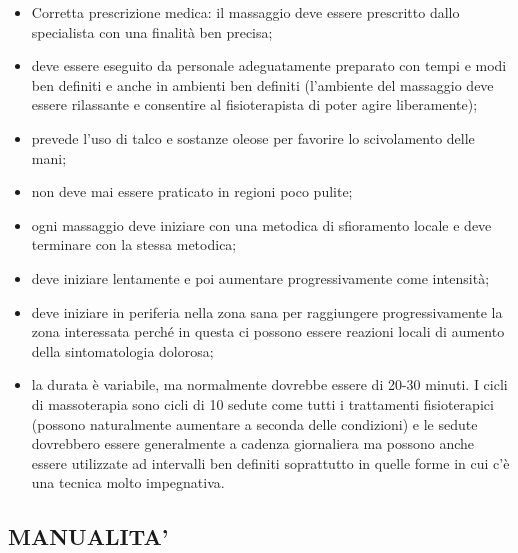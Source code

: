 \begin{itemize}
\item

  Corretta prescrizione medica: il massaggio deve essere prescritto
  dallo specialista con una finalità ben precisa;

\item

  deve essere eseguito da personale adeguatamente preparato con tempi e
  modi ben definiti e anche in ambienti ben definiti (l'ambiente del
  massaggio deve essere rilassante e consentire al fisioterapista di
  poter agire liberamente);

\item

  prevede l'uso di talco e sostanze oleose per favorire lo scivolamento
  delle mani;

\item

  non deve mai essere praticato in regioni poco pulite;

\item

  ogni massaggio deve iniziare con una metodica di sfioramento locale e
  deve terminare con la stessa metodica;

\item

  deve iniziare lentamente e poi aumentare progressivamente come
  intensità;

\item

  deve iniziare in periferia nella zona sana per raggiungere
  progressivamente la zona interessata perché in questa ci possono
  essere reazioni locali di aumento della sintomatologia dolorosa;

\item

  la durata è variabile, ma normalmente dovrebbe essere di 20-30 minuti.
  I cicli di massoterapia sono cicli di 10 sedute come tutti i
  trattamenti fisioterapici (possono naturalmente aumentare a seconda
  delle condizioni) e le sedute dovrebbero essere generalmente a cadenza
  giornaliera ma possono anche essere utilizzate ad intervalli ben
  definiti soprattutto in quelle forme in cui c'è una tecnica molto
  impegnativa.

\end{itemize}

\subsection{MANUALITA'}


